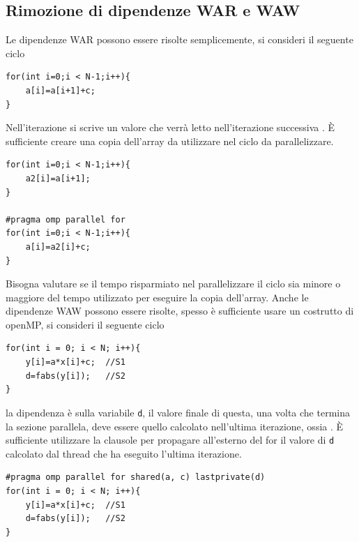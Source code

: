 \documentclass[10pt, letterpaper]{report}
\begin{document}
\subsection{Rimozione di dipendenze WAR e WAW}
Le dipendenze WAR possono essere risolte semplicemente, si consideri il seguente ciclo
\begin{lstlisting}[style=CStyle]
for(int i=0;i < N-1;i++){
    a[i]=a[i+1]+c;
}
\end{lstlisting}
Nell'iterazione  si scrive un valore che verrà letto nell'iterazione successiva . È sufficiente creare una copia dell'array  da utilizzare nel ciclo da parallelizzare.
\begin{lstlisting}[style=CStyle]
for(int i=0;i < N-1;i++){
    a2[i]=a[i+1];
}

#pragma omp parallel for 
for(int i=0;i < N-1;i++){
    a[i]=a2[i]+c;
}
\end{lstlisting}
Bisogna valutare se il tempo risparmiato nel parallelizzare il ciclo sia minore o maggiore del tempo utilizzato per eseguire la copia dell'array.\acc 
Anche le dipendenze WAW possono essere risolte, spesso è sufficiente usare un costrutto di openMP, si consideri il seguente ciclo
\begin{lstlisting}[style=CStyle]
for(int i = 0; i < N; i++){
    y[i]=a*x[i]+c;  //S1 
    d=fabs(y[i]);   //S2
}
\end{lstlisting}
la dipendenza è sulla variabile \texttt{d}, il valore finale di questa, una volta che termina la sezione  parallela, deve essere quello calcolato nell'ultima iterazione, ossia . È sufficiente utilizzare la clausole  per propagare all'esterno del for il valore di \texttt{d} calcolato dal thread che ha eseguito l'ultima iterazione.
\begin{lstlisting}[style=CStyle]
#pragma omp parallel for shared(a, c) lastprivate(d)
for(int i = 0; i < N; i++){
    y[i]=a*x[i]+c;  //S1 
    d=fabs(y[i]);   //S2
}
\end{lstlisting}
\flowerLine
\end{document}
